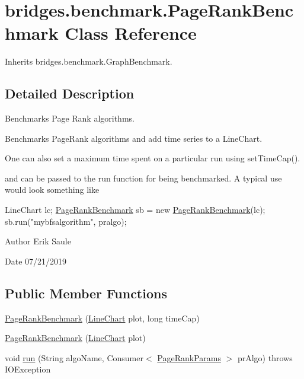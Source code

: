 \hypertarget{classbridges_1_1benchmark_1_1_page_rank_benchmark}{}\section{bridges.\+benchmark.\+Page\+Rank\+Benchmark Class Reference}
\label{classbridges_1_1benchmark_1_1_page_rank_benchmark}


Inherits bridges.\+benchmark.\+Graph\+Benchmark.



\subsection{Detailed Description}
Benchmarks Page Rank algorithms. 

Benchmarks Page\+Rank algorithms and add time series to a Line\+Chart.

One can also set a maximum time spent on a particular run using set\+Time\+Cap().

and can be passed to the run function for being benchmarked. A typical use would look something like


\begin{DoxyCode}
LineChart lc;
\hyperlink{classbridges_1_1benchmark_1_1_page_rank_benchmark_afd361f9cae2425b44794e2599cc25af1}{PageRankBenchmark} sb  = \textcolor{keyword}{new} \hyperlink{classbridges_1_1benchmark_1_1_page_rank_benchmark_afd361f9cae2425b44794e2599cc25af1}{PageRankBenchmark}(lc);
sb.run(\textcolor{stringliteral}{"mybfsalgorithm"}, pralgo);
\end{DoxyCode}


\begin{DoxyAuthor}{Author}
Erik Saule 
\end{DoxyAuthor}
\begin{DoxyDate}{Date}
07/21/2019 
\end{DoxyDate}
\subsection*{Public Member Functions}
\begin{DoxyCompactItemize}
\item 
\hyperlink{classbridges_1_1benchmark_1_1_page_rank_benchmark_afd361f9cae2425b44794e2599cc25af1}{Page\+Rank\+Benchmark} (\hyperlink{classbridges_1_1base_1_1_line_chart}{Line\+Chart} plot, long time\+Cap)
\item 
\hyperlink{classbridges_1_1benchmark_1_1_page_rank_benchmark_a3a74e3703d4bc24b02a9dcb59b976792}{Page\+Rank\+Benchmark} (\hyperlink{classbridges_1_1base_1_1_line_chart}{Line\+Chart} plot)
\item 
void \hyperlink{classbridges_1_1benchmark_1_1_page_rank_benchmark_a6738599d19f7a856a16615f69050c8b3}{run} (String algo\+Name, Consumer$<$ \hyperlink{classbridges_1_1benchmark_1_1_page_rank_params}{Page\+Rank\+Params} $>$ pr\+Algo)  throws I\+O\+Exception 
\end{DoxyCompactItemize}


